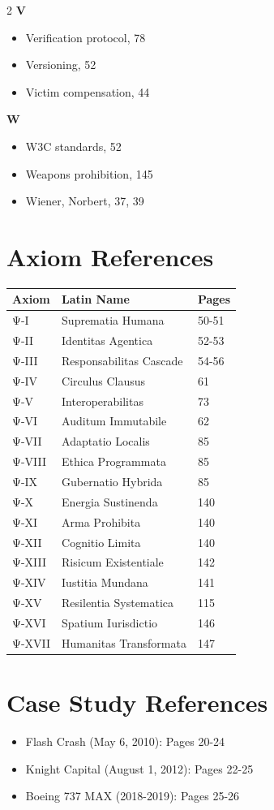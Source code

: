\begin{multicols}{2}
\textbf{V}
\begin{itemize}[leftmargin=0.5cm]
\item Verification protocol, 78
\item Versioning, 52
\item Victim compensation, 44
\end{itemize}

\textbf{W}
\begin{itemize}[leftmargin=0.5cm]
\item W3C standards, 52
\item Weapons prohibition, 145
\item Wiener, Norbert, 37, 39
\end{itemize}

\end{multicols}

\vspace{1cm}

\section*{Axiom References}

\begin{tabular}{lll}
\textbf{Axiom} & \textbf{Latin Name} & \textbf{Pages} \\
\hline
Ψ-I & Suprematia Humana & 50-51 \\
Ψ-II & Identitas Agentica & 52-53 \\
Ψ-III & Responsabilitas Cascade & 54-56 \\
Ψ-IV & Circulus Clausus & 61 \\
Ψ-V & Interoperabilitas & 73 \\
Ψ-VI & Auditum Immutabile & 62 \\
Ψ-VII & Adaptatio Localis & 85 \\
Ψ-VIII & Ethica Programmata & 85 \\
Ψ-IX & Gubernatio Hybrida & 85 \\
Ψ-X & Energia Sustinenda & 140 \\
Ψ-XI & Arma Prohibita & 140 \\
Ψ-XII & Cognitio Limita & 140 \\
Ψ-XIII & Risicum Existentiale & 142 \\
Ψ-XIV & Iustitia Mundana & 141 \\
Ψ-XV & Resilentia Systematica & 115 \\
Ψ-XVI & Spatium Iurisdictio & 146 \\
Ψ-XVII & Humanitas Transformata & 147 \\
\end{tabular}

\vspace{1cm}

\section*{Case Study References}

\begin{itemize}
\item Flash Crash (May 6, 2010): Pages 20-24
\item Knight Capital (August 1, 2012): Pages 22-25
\item Boeing 737 MAX (2018-2019): Pages 25-26
\end{itemize}
